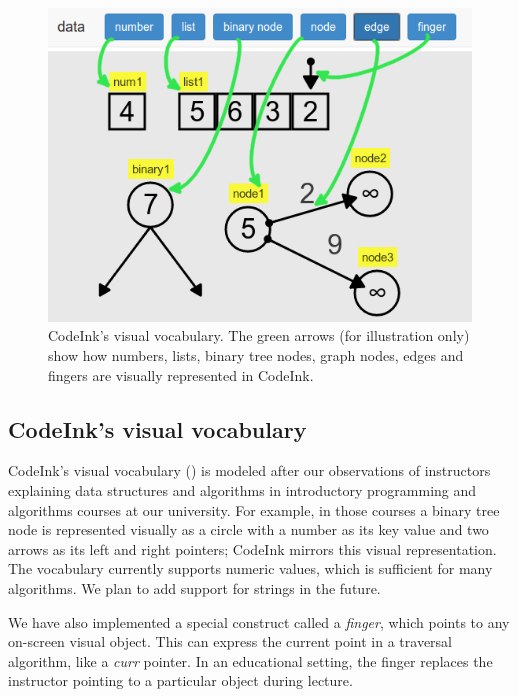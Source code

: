 \begin{figure} %

\begin{center}
\includegraphics[width=0.8\columnwidth]{img/visual-vocabulary.png}
\end{center}

\caption{CodeInk's visual vocabulary. The green arrows (for illustration only)
show how numbers, lists, binary tree nodes, graph nodes, edges and fingers are
visually represented in CodeInk.}

\label{fig:visual_vocab}
\end{figure}

\subsection{CodeInk's visual vocabulary}

CodeInk's visual vocabulary () is modeled after our
observations of instructors explaining data structures and algorithms in
introductory programming and algorithms courses at our university. For example, in those courses a
binary tree node is represented visually as a circle with a number as its key
value and two arrows as its left and right pointers; CodeInk mirrors this visual
representation. The vocabulary currently supports numeric
values, which is sufficient for many algorithms. We plan to add support for
strings in the future.

We have also implemented a special construct called a \emph{finger}, which
points to any on-screen visual object. This can express the current point in a
traversal algorithm, like a \emph{curr} pointer. In an educational setting, the
finger replaces the instructor pointing to a particular object during lecture.

